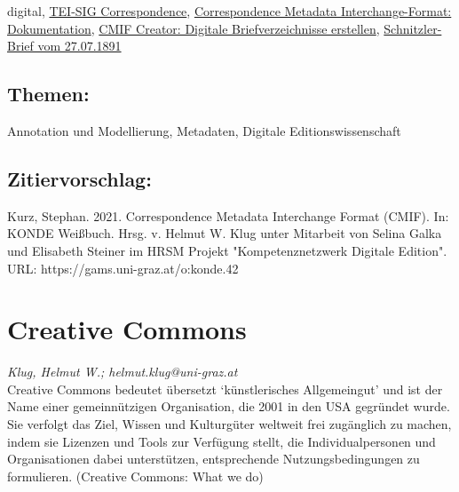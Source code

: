 \documentclass{article}
\begin{document}
{                           digital}, \href{https://github.com/TEI-Correspondence-SIG/CMIF}{TEI-SIG
                           Correspondence}, \href{https://correspsearch.net/index.xql?id=participate_cmi-format}{Correspondence Metadata Interchange-Format: Dokumentation}, \href{https://correspsearch.net/creator/index.xql?l=de}{CMIF Creator:
                           Digitale Briefverzeichnisse erstellen}, \href{https://github.com/acdh-oeaw/schnitzler-briefe/blob/master/data/editions/1891-07-27_01.xml}{Schnitzler-Brief vom 27.07.1891}\subsection*{Themen:}Annotation und Modellierung, Metadaten, Digitale Editionswissenschaft\subsection*{Zitiervorschlag:}Kurz, Stephan. 2021. Correspondence Metadata Interchange Format (CMIF). In: KONDE Weißbuch. Hrsg. v. Helmut W. Klug unter Mitarbeit von Selina Galka und Elisabeth Steiner im HRSM Projekt "Kompetenznetzwerk Digitale Edition". URL: https://gams.uni-graz.at/o:konde.42\newpage\section*{Creative Commons} \emph{Klug, Helmut W.; helmut.klug@uni-graz.at }\\
        
    Creative Commons bedeutet übersetzt ‘künstlerisches Allgemeingut’ und ist der Name
                  einer gemeinnützigen Organisation, die 2001 in den USA gegründet wurde. Sie
                  verfolgt das Ziel, Wissen und Kulturgüter weltweit frei zugänglich zu machen,
                  indem sie Lizenzen und Tools zur Verfügung stellt, die Individualpersonen und
                  Organisationen dabei unterstützen, entsprechende Nutzungsbedingungen zu
                  formulieren. (Creative Commons: What we do)\\
            
\end{document}
